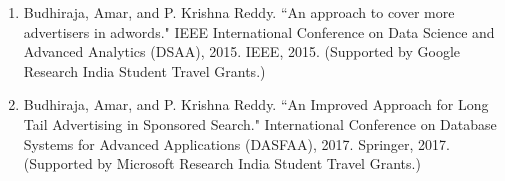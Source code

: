 \begin{enumerate}
    \item Budhiraja, Amar, and P. Krishna Reddy. ``An approach to cover more advertisers in adwords." IEEE International Conference on Data Science and Advanced Analytics (DSAA), 2015. IEEE, 2015. (Supported by Google Research India Student Travel Grants.)
    \item Budhiraja, Amar, and P. Krishna Reddy. ``An Improved Approach for Long Tail Advertising in Sponsored Search." International Conference on Database Systems for Advanced Applications (DASFAA), 2017. Springer, 2017. (Supported by Microsoft Research India Student Travel Grants.)
\end{enumerate}